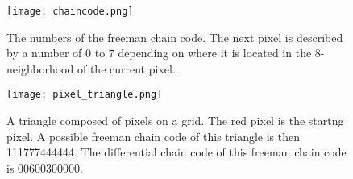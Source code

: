 \documentclass[thesis.tex]{subfiles}
\begin{document}
\begin{figure}[h]
\centering
\texttt{[image: chaincode.png]}
\caption{The numbers of the freeman chain code. The next pixel is described by a number of 0 to 7 depending on where it is located in the 8-neighborhood of the current pixel.}
\label{fig:freeman}
\end{figure}

\begin{figure}[h]
\centering
\texttt{[image: pixel\_triangle.png]}
\caption{A triangle composed of pixels on a grid. The red pixel is the startng pixel. A possible freeman chain code of this triangle is then 111777444444. The differential chain code of this freeman chain code is 00600300000.}
\label{fig:pixel_triangle}
\end{figure}

\subfilebib %
\end{document}
